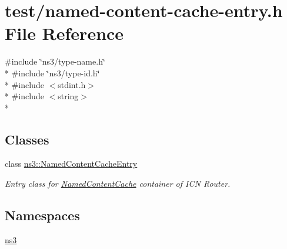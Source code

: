 \hypertarget{test_2named-content-cache-entry_8h}{\section{test/named-\/content-\/cache-\/entry.h File Reference}
\label{test_2named-content-cache-entry_8h}
}
{\ttfamily \#include \char`\"{}ns3/type-\/name.\-h\char`\"{}}\\*
{\ttfamily \#include \char`\"{}ns3/type-\/id.\-h\char`\"{}}\\*
{\ttfamily \#include $<$stdint.\-h$>$}\\*
{\ttfamily \#include $<$string$>$}\\*
\subsection*{Classes}
\begin{DoxyCompactItemize}
\item 
class \hyperlink{classns3_1_1NamedContentCacheEntry}{ns3\-::\-Named\-Content\-Cache\-Entry}
\begin{DoxyCompactList}\small\item\em Entry class for \hyperlink{classns3_1_1NamedContentCache}{Named\-Content\-Cache} container of I\-C\-N Router. \end{DoxyCompactList}\end{DoxyCompactItemize}
\subsection*{Namespaces}
\begin{DoxyCompactItemize}
\item 
\hyperlink{namespacens3}{ns3}
\end{DoxyCompactItemize}
